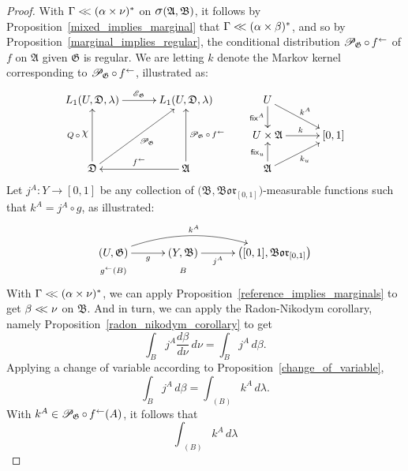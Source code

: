 \documentclass[
twoside=true,
paper=letter,
fontsize=9pt,
pagesize=auto,
leqno,
openany,
headsepline,
overfullrule,
]{scrbook}
\theoremstyle{plain}
\theoremstyle{plain}
\theoremstyle{definition}
\theoremstyle{bfnoteitalic}
\theoremstyle{bfnoteroman}
\newcommand{\sigalg}[1]{\mathfrak{#1}}
\newcommand{\cali}[1]{\mathscr{#1}}
\newcommand{\sfop}[1]{\mathsf{#1}}
\newcommand{\condexpop}[1]{\mathop{\cali{E}\hspace{-1pt}}\nolimits_{#1}}
\newcommand{\condprobop}[1]{\mathop{\cali{P}\hspace{-1pt}}\nolimits_{#1}}
\newcommand{\borel}{\mathfrak{Bor}}
\newcommand{\sagb}{\mathop{\hbox{\large{$\sigma$}}}\nolimits}
\newcommand{\charfunction}[1]{\mathop{{\raisebox{2pt}{$\chi$}}_{#1}}}
\newcommand{\preimage}[1]{\mathop{#1^{\leftarrow}}}
\newcommand{\sigmaalgebra}{\sigalg{A}}
\newcommand{\sigmaalgebraii}{\sigalg{B}}
\newcommand{\productsig}[2]{\sagb(#1,#2)}
\newcommand{\funcf}{f}
\newcommand{\funcg}{g}
\newcommand{\funcj}{j}
\newcommand{\funck}{k}
\newcommand{\function}{f}
\newcommand{\measurespaceii}{Y}
\newcommand{\abscont}{\mathrel{< \kern-3.5pt <}}
\newcommand{\measnu}{\nu}
\newcommand{\measureiii}{\lambda}
\newcommand{\measlambda}{\lambda}
\newcommand{\seti}{A}
\newcommand{\setii}{B}
\newcommand{\fixinthefirst}[1]{\sfop{fix}_{#1}}
\newcommand{\fixinthesecond}[1]{\sfop{fix}^{#1}}
\newcommand{\uspace}{U}%
\newcommand{\uspaceelt}{u}
\newcommand{\uspacesig}{\sigalg{D}}
\newcommand{\measonprod}{\Gamma}%
\newcommand{\marginalone}{\alpha}%
\newcommand{\marginaltwo}{\beta}%
\begin{document}
\begin{proof}
With
$\measonprod \abscont (\marginalone\times\measnu)^*$
on
$\productsig{\sigmaalgebra}{\sigmaalgebraii}$,
it follows by Proposition~\ref{mixed_implies_marginal} that
$\measonprod \abscont (\marginalone\times\marginaltwo)^*$,
and so by Proposition~\ref{marginal_implies_regular},
the conditional distribution
$\condprobop{\sigalg{G}}\circ \preimage{\funcf}$ of $\funcf$ on
$\sigmaalgebra$ given $\sigalg{G}$
is regular.
We are letting $\funck$ denote the Markov kernel corresponding to
$\condprobop{\sigalg{G}}\circ \preimage{\funcf}$,
illustrated as:
\[%
\xymatrix@R=16pt@C=30pt{
L_1(\uspace, \uspacesig, \measureiii) \ar[r]^{\condexpop{\sigalg{G}}}
& L_1(\uspace, \uspacesig, \measureiii)
& \uspace
\ar[d]_-{\fixinthesecond{\seti}}
\ar[dr]^{\funck^\seti}
\\
&
& \uspace\times\sigmaalgebra \ar[r]^{\funck}
& [0,1]
\\
\uspacesig
\ar[uu]^{Q\,\circ\,\charfunction{}}
\ar[uur]_{\condprobop{\sigalg{G}}}
& \sigmaalgebra
\ar[uu]_{\condprobop{\sigalg{G}}\circ \preimage{\function}}
\ar[l]_{\preimage{\function}}
& \sigmaalgebra
\ar[u]^{\fixinthefirst{\uspaceelt}}
\ar[ur]_{\funck_\uspaceelt}
&
\\
}
\]
Let
$\funcj^\seti : \measurespaceii \to [0,1]$
be any collection of
$\bigl( \sigmaalgebraii,\borel_{[0,1]} \bigr)$\hyp{}measurable
functions such that
$\funck^\seti = \funcj^\seti \circ \funcg$, as illustrated:
\[
\xymatrix@R=0pt@C=30pt{
(\uspace,\sigalg{G})
\ar[r]_-{\funcg} \ar@/^16pt/[rr]^{\funck^\seti}
& (\measurespaceii,\sigmaalgebraii)
\ar[r]_-{\funcj^\seti}
& \bigl( [0,1], \borel_{[0,1]} \bigr) \\
\scriptstyle{\preimage{\funcg}(\setii)} & \scriptstyle{\setii} & \\
}
\]
With
$\measonprod\abscont(\marginalone\times\measnu)^*$,
we can apply Proposition~\ref{reference_implies_marginals} to get
$\marginaltwo\abscont\measnu$ on $\sigmaalgebraii$.
And in turn, we can apply the Radon-Nikodym corollary, namely Proposition~\ref{radon_nikodym_corollary} to get
\[
\int_\setii \funcj^\seti  \dfrac{d\marginaltwo}{d\measnu} \, d \measnu
=
\int_\setii \funcj^\seti \, d \marginaltwo.
\]
Applying a change of variable according to Proposition~\ref{change_of_variable},
\[
\int_\setii \funcj^\seti \, d \marginaltwo
=
\int_{\preimage{\funcg}(\setii)}
\funck^\seti \, d\measlambda.
\]
With
$\funck^\seti \in \condprobop{\sigalg{G}}\circ \preimage{\funcf}(\seti)$,
it follows that
\[
\int_{\preimage{\funcg}(\setii)}
\funck^\seti \, d\measlambda
\]
\end{proof}
\end{document}
